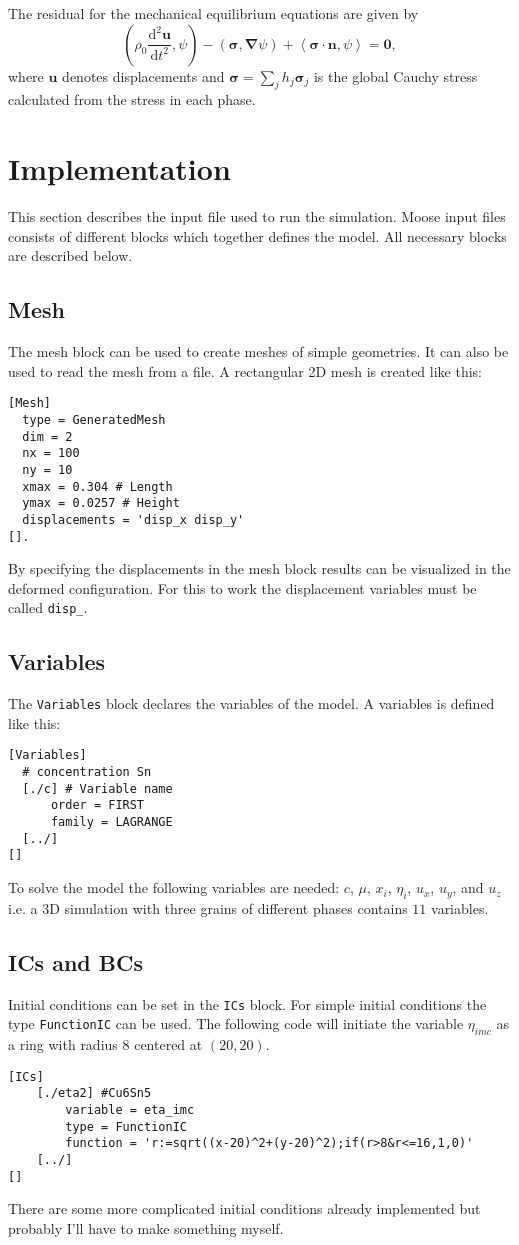 \documentclass[12pt,a4paper]{article}
\providecommand{\secdiff}[2]{\frac{\mathrm{d}^2#1}{\mathrm{d}#2^2}}
\providecommand{\vbf}[1]{\boldsymbol{#1}}
\providecommand{\gradient}[0]{\vbf{\nabla}}
\providecommand{\vint}[2]{\left(#1,#2\right)}
\providecommand{\sint}[2]{\left<#1,#2\right>}
\begin{document}
The residual for the mechanical equilibrium equations are given by
\begin{equation}
  \vint{\rho_0\secdiff{\vbf{u}}{t}}{\psi}-\vint{\vbf{\sigma}}{\gradient\psi}+\sint{\vbf{\sigma}\cdot\vbf{n}}{\psi}=\vbf{0},
\end{equation}
where $\vbf{u}$ denotes displacements and $\vbf{\sigma}=\sum_jh_j\vbf{\sigma}_j$ is the global Cauchy stress calculated from the stress in each phase.


\section{Implementation}
This section describes the input file used to run the simulation.
Moose input files consists of different blocks which together defines the model.
All necessary blocks are described below.
\subsection{Mesh}
The mesh block can be used to create meshes of simple geometries.
It can also be used to read the mesh from a file.
A rectangular 2D mesh is created like this:
\begin{verbatim}
[Mesh]
  type = GeneratedMesh
  dim = 2
  nx = 100
  ny = 10
  xmax = 0.304 # Length 
  ymax = 0.0257 # Height
  displacements = 'disp_x disp_y'
[].
\end{verbatim}
By specifying the displacements in the mesh block results can be visualized in the deformed configuration.
For this to work the displacement variables must be called \texttt{disp\_}.

\subsection{Variables}
The \texttt{Variables} block declares the variables of the model.
A variables is defined like this:
\begin{verbatim}
[Variables]
  # concentration Sn
  [./c] # Variable name
      order = FIRST
      family = LAGRANGE
  [../]
[]
\end{verbatim}
To solve the model the following variables are needed: $c$, $\mu$, $x_i$, $\eta_i$, $u_x$, $u_y$, and $u_z$ i.e. a 3D simulation with three grains of different phases contains $11$ variables.

\subsection{ICs and BCs}
Initial conditions can be set in the \texttt{ICs} block. 
For simple initial conditions the type \texttt{FunctionIC} can be used.
The following code will initiate the variable $\eta_{imc}$ as a ring with radius $8$ centered at $(20,20)$.
\begin{verbatim}
[ICs]
    [./eta2] #Cu6Sn5
        variable = eta_imc
        type = FunctionIC
        function = 'r:=sqrt((x-20)^2+(y-20)^2);if(r>8&r<=16,1,0)'
    [../]
[]
\end{verbatim}
There are some more complicated initial conditions already implemented but probably I'll have to make something myself.
\end{document}
